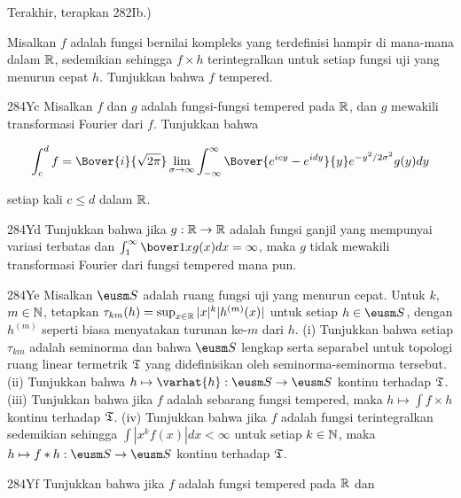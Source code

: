 {

\noindent Terakhir, terapkan 282Ib.) %

 Misalkan $f$ adalah fungsi bernilai kompleks yang
terdefinisi hampir di mana-mana dalam $\Bbb R$, sedemikian sehingga $f\times h$
terintegralkan untuk setiap fungsi uji yang menurun cepat $h$. Tunjukkan bahwa
$f$ tempered. %

\spheader 284Yc Misalkan $f$ dan $g$ adalah fungsi-fungsi tempered pada
$\Bbb R$, dan $g$ mewakili transformasi Fourier dari $f$. Tunjukkan bahwa

$$\int_c^df
=\Bover{i}{\sqrt{2\pi}}\lim_{\sigma\to\infty}\int_{-\infty}^{\infty}
\Bover{e^{icy}-e^{idy}}{y}e^{-y^2/2\sigma^2}g(y)dy$$

\noindent setiap kali $c\le d$ dalam $\Bbb R$.  %

\spheader 284Yd Tunjukkan bahwa jika $g:\Bbb R\to\Bbb R$ adalah fungsi ganjil
yang mempunyai variasi terbatas dan
$\int_1^{\infty}\bover1x g(x)dx=\infty$, maka $g$ tidak mewakili transformasi
Fourier dari fungsi tempered mana pun. 

\ifdim\pagewidth>467pt\fontdimen3\tenrm=1.84pt
 \fontdimen4\tenrm=1.22pt\fi
\spheader 284Ye Misalkan $\eusm S$ adalah ruang fungsi uji yang menurun cepat.
Untuk $k$, $m\in\Bbb N$, tetapkan
$\tau_{km}(h)=\sup_{x\in\Bbb R}|x|^k|h^{(m)}(x)|$ untuk setiap $h\in\eusm S$,
dengan $h^{(m)}$ seperti biasa menyatakan turunan ke-$m$ dari $h$. (i)
Tunjukkan bahwa setiap $\tau_{km}$ adalah seminorma dan bahwa $\eusm S$
lengkap serta separabel untuk topologi ruang linear termetrik $\frak T$ yang
didefinisikan oleh seminorma-seminorma tersebut. (ii) Tunjukkan bahwa
$h\mapsto\varhat{h}:\eusm S\to\eusm S$ kontinu terhadap $\frak T$. (iii)
Tunjukkan bahwa jika $f$ adalah sebarang fungsi tempered, maka
$h\mapsto\int f\times h$ kontinu terhadap $\frak T$. (iv) Tunjukkan bahwa jika
$f$ adalah fungsi terintegralkan sedemikian sehingga
$\int|x^kf(x)|dx<\infty$ untuk setiap $k\in\Bbb N$, maka
$h\mapsto f*h:\eusm S\to\eusm S$ kontinu terhadap $\frak T$. %
\tenrm=1.67pt\tenrm=1.22pt

\spheader 284Yf Tunjukkan bahwa jika $f$ adalah fungsi tempered pada $\Bbb R$
dan

}
